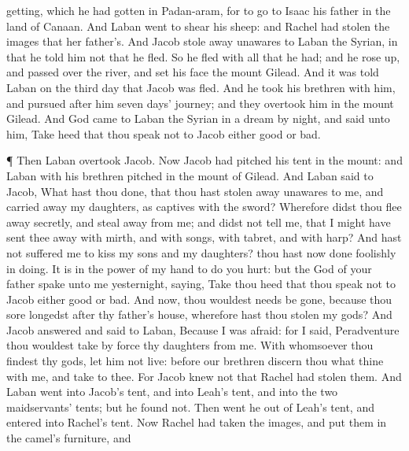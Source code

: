 {getting, which he had
gotten in
Padan-aram, for to
go to
Isaac his
father in the
land of
Canaan.
And
Laban
went to
shear his
sheep: and
Rachel had
stolen the
images that
{} her
father’s.
And
Jacob stole
away
unawares to
Laban the
Syrian, in
that he
told him
not that he
fled.
So he
fled with all that he had; and he rose
up, and passed
over the
river, and
set his
face
{} the
mount
Gilead.
And it was
told
Laban on the
third
day that
Jacob was
fled.
And he
took his
brethren with him, and
pursued after
him
seven
days’
journey; and they
overtook him in the
mount
Gilead.
And
God
came to
Laban the
Syrian in a
dream by
night, and
said unto him, Take
heed that thou
speak not
to
Jacob either
good
or
bad.
\par }{\PP {}¶ Then
Laban
overtook
Jacob. Now
Jacob had
pitched his
tent in the
mount: and
Laban with his
brethren
pitched in the
mount of
Gilead.
And
Laban
said to
Jacob, What hast thou
done, that thou hast stolen
away
unawares to me, and carried
away my
daughters, as
captives
{} with the
sword?
Wherefore didst thou flee
away
secretly, and steal
away from me; and didst not
tell me, that I might have sent thee
away with
mirth, and with
songs, with
tabret, and with
harp?
And hast not
suffered me to
kiss my
sons and my
daughters? thou hast now done
foolishly in
{}
doing.
It
is in the
power of my
hand to
do you
hurt: but the
God of your
father
spake unto me
yesternight,
saying, Take thou
heed that thou speak
not to
Jacob either
good or
bad.
And now,
{} thou wouldest
needs be
gone, because thou
sore
longedst after thy
father’s
house,
{} wherefore hast thou
stolen my
gods?
And
Jacob
answered and
said to
Laban, Because I was
afraid: for I
said,
Peradventure thou wouldest take by
force thy
daughters from me.
With
whomsoever thou
findest thy
gods, let him not
live:
before our
brethren
discern thou what
{} thine with me, and
take
{} to thee. For
Jacob
knew not that
Rachel had
stolen them.
And
Laban
went into
Jacob’s
tent, and into
Leah’s
tent, and into the
two
maidservants’
tents; but he
found
{} not. Then went he
out of
Leah’s
tent, and
entered into
Rachel’s
tent.
Now
Rachel had
taken the
images, and
put them in the
camel’s
furniture, and
}
